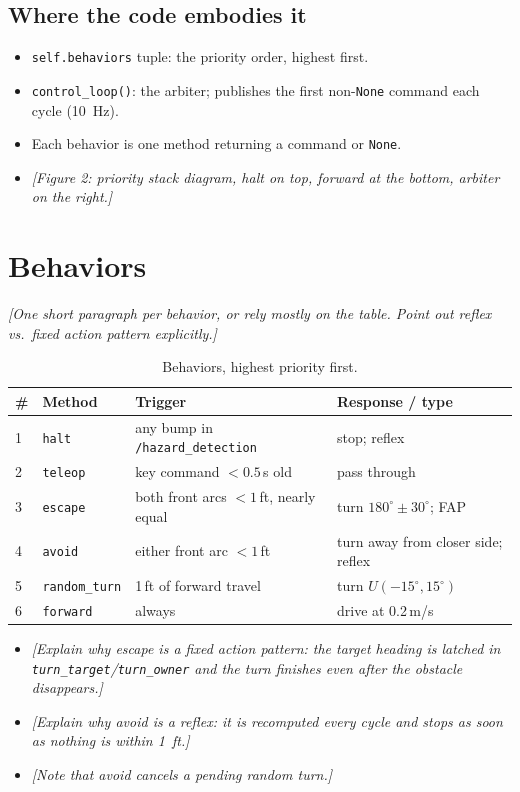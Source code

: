\documentclass[11pt]{article}
\newcommand{\prompt}[1]{\textit{[#1]}}
\begin{document}
\subsection{Where the code embodies it}
\begin{itemize}
  \item \texttt{self.behaviors} tuple: the priority order, highest first.
  \item \texttt{control\_loop()}: the arbiter; publishes the first
        non-\texttt{None} command each cycle (10~Hz).
  \item Each behavior is one method returning a command or \texttt{None}.
  \item \prompt{Figure 2: priority stack diagram, halt on top,
        forward at the bottom, arbiter on the right.}
\end{itemize}

\section{Behaviors}
\prompt{One short paragraph per behavior, or rely mostly on the table.
Point out reflex vs.\ fixed action pattern explicitly.}

\begin{table}[h]
\centering\small
\begin{tabular}{@{}llll@{}}
\toprule
\# & Method & Trigger & Response / type \\
\midrule
1 & \texttt{halt} & any bump in \texttt{/hazard\_detection} & stop; reflex \\
2 & \texttt{teleop} & key command $<0.5$\,s old & pass through \\
3 & \texttt{escape} & both front arcs $<1$\,ft, nearly equal & turn
    $180^\circ\pm30^\circ$; FAP \\
4 & \texttt{avoid} & either front arc $<1$\,ft & turn away from closer
    side; reflex \\
5 & \texttt{random\_turn} & 1\,ft of forward travel & turn
    $U(-15^\circ,15^\circ)$ \\
6 & \texttt{forward} & always & drive at 0.2\,m/s \\
\bottomrule
\end{tabular}
\caption{Behaviors, highest priority first.}
\end{table}

\begin{itemize}
  \item \prompt{Explain why escape is a fixed action pattern: the target
        heading is latched in \texttt{turn\_target}/\texttt{turn\_owner}
        and the turn finishes even after the obstacle disappears.}
  \item \prompt{Explain why avoid is a reflex: it is recomputed every
        cycle and stops as soon as nothing is within 1~ft.}
  \item \prompt{Note that avoid cancels a pending random turn.}
\end{itemize}
\end{document}
